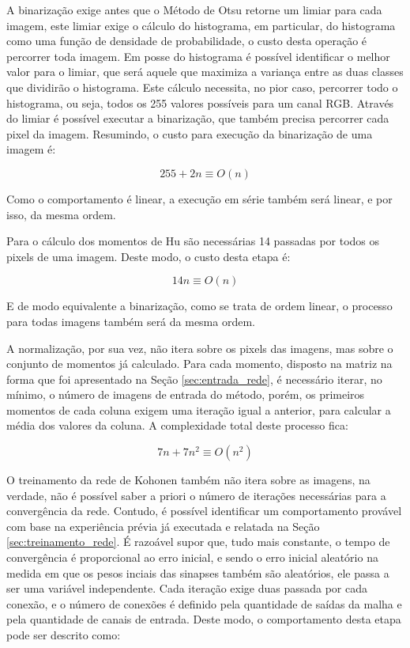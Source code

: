 A binarização exige antes que o Método de Otsu retorne um limiar para cada
imagem, este limiar exige o cálculo do histograma, em particular, do histograma
como uma função de densidade de probabilidade, o custo desta operação é
percorrer toda imagem. Em posse do histograma é possível identificar o melhor
valor para o limiar, que será aquele que maximiza a variança entre as duas
classes que dividirão o histograma. Este cálculo necessita, no pior caso,
percorrer todo o histograma, ou seja, todos os 255 valores possíveis para um
canal RGB. Através do limiar é possível executar a binarização, que também
precisa percorrer cada pixel da imagem. Resumindo, o custo para execução da
binarização de uma imagem é:

\begin{equation}\label{eq:bin_assin_uni}
255 + 2n \equiv O(n)
\end{equation}

Como o comportamento é linear, a execução em série também será linear, e por
isso, da mesma ordem.

Para o cálculo dos momentos de Hu são necessárias 14 passadas por todos os
pixels de uma imagem. Deste modo, o custo desta etapa é:

\begin{equation}\label{eq:hu_uni}
14n \equiv O(n)
\end{equation}

E de modo equivalente a binarização, como se trata de ordem linear, o processo
para todas imagens também será da mesma ordem.

A normalização, por sua vez, não itera sobre os pixels das imagens, mas
sobre o conjunto de momentos já calculado. Para cada momento, disposto na
matriz na forma que foi apresentado na Seção \ref{sec:entrada_rede}, é
necessário iterar, no mínimo, o número de imagens de entrada do método, porém,
os primeiros momentos de cada coluna exigem uma iteração igual a anterior,
para calcular a média dos valores da coluna. A complexidade
total deste processo fica:

\begin{equation}\label{eq:norm_uni}
7n + 7n^2 \equiv O(n^2)
\end{equation}

O treinamento da rede de Kohonen também não itera sobre as imagens, na verdade,
não é possível saber a priori o número de iterações necessárias para a
convergência da rede. Contudo, é possível identificar um comportamento provável
com base na experiência prévia já executada e relatada na Seção
\ref{sec:treinamento_rede}. É razoável supor que, tudo mais constante, o tempo
de convergência é proporcional ao erro inicial, e sendo o erro inicial aleatório
na medida em que os pesos inciais das
sinapses também são aleatórios, ele passa a ser uma variável independente. Cada
iteração exige duas passada por cada conexão, e o número de conexões é definido
pela quantidade de saídas da malha e pela quantidade de canais de entrada.
Deste modo, o comportamento desta etapa pode ser descrito como:

